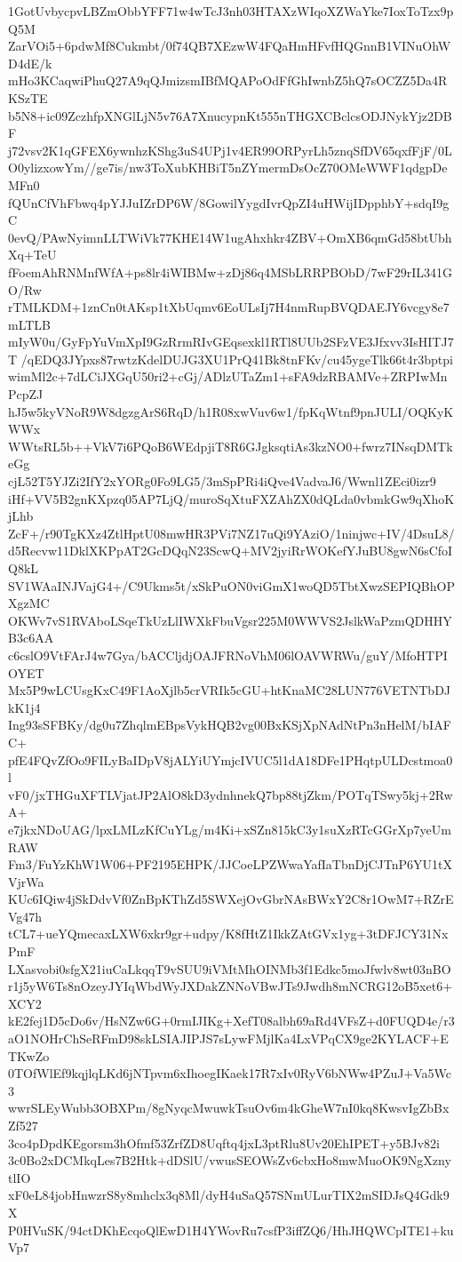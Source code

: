 1GotUvbycpvLBZmObbYFF71w4wTcJ3nh03HTAXzWIqoXZWaYke7IoxToTzx9pQ5M
ZarVOi5+6pdwMf8Cukmbt/0f74QB7XEzwW4FQaHmHFvfHQGnnB1VINuOhWD4dE/k
mHo3KCaqwiPhuQ27A9qQJmizsmIBfMQAPoOdFfGhIwnbZ5hQ7sOCZZ5Da4RKSzTE
b5N8+ic09ZczhfpXNGlLjN5v76A7XnucypnKt555nTHGXCBclcsODJNykYjz2DBF
j72vsv2K1qGFEX6ywnhzKShg3uS4UPj1v4ER99ORPyrLh5znqSfDV65qxfFjF/0L
O0ylizxowYm//ge7is/nw3ToXubKHBiT5nZYmermDsOcZ70OMeWWF1qdgpDeMFn0
fQUnCfVhFbwq4pYJJuIZrDP6W/8GowilYygdIvrQpZI4uHWijIDpphbY+sdqI9gC
0evQ/PAwNyimnLLTWiVk77KHE14W1ugAhxhkr4ZBV+OmXB6qmGd58btUbhXq+TeU
fFoemAhRNMnfWfA+ps8lr4iWIBMw+zDj86q4MSbLRRPBObD/7wF29rIL341GO/Rw
rTMLKDM+1znCn0tAKsp1tXbUqmv6EoULsIj7H4nmRupBVQDAEJY6vcgy8e7mLTLB
mIyW0u/GyFpYuVmXpI9GzRrmRIvGEqsexkl1RTl8UUb2SFzVE3Jfxvv3IsHITJ7T
/qEDQ3JYpxs87rwtzKdelDUJG3XU1PrQ41Bk8tnFKv/cu45ygeTlk66t4r3bptpi
wimMl2c+7dLCiJXGqU50ri2+cGj/ADlzUTaZm1+sFA9dzRBAMVe+ZRPIwMnPcpZJ
hJ5w5kyVNoR9W8dgzgArS6RqD/h1R08xwVuv6w1/fpKqWtnf9pnJULI/OQKyKWWx
WWtsRL5b++VkV7i6PQoB6WEdpjiT8R6GJgksqtiAs3kzNO0+fwrz7INsqDMTkeGg
cjL52T5YJZi2IfY2xYORg0Fo9LG5/3mSpPRi4iQve4VadvaJ6/Wwnl1ZEci0izr9
iHf+VV5B2gnKXpzq05AP7LjQ/muroSqXtuFXZAhZX0dQLda0vbmkGw9qXhoKjLhb
ZcF+/r90TgKXz4ZtlHptU08mwHR3PVi7NZ17uQi9YAziO/1ninjwc+IV/4DsuL8/
d5Recvw11DklXKPpAT2GcDQqN23ScwQ+MV2jyiRrWOKefYJuBU8gwN6sCfoIQ8kL
SV1WAaINJVajG4+/C9Ukms5t/xSkPuON0viGmX1woQD5TbtXwzSEPIQBhOPXgzMC
OKWv7vS1RVAboLSqeTkUzLlIWXkFbuVgsr225M0WWVS2JslkWaPzmQDHHYB3c6AA
c6cslO9VtFArJ4w7Gya/bACCljdjOAJFRNoVhM06lOAVWRWu/guY/MfoHTPIOYET
Mx5P9wLCUsgKxC49F1AoXjlb5crVRIk5cGU+htKnaMC28LUN776VETNTbDJkK1j4
Ing93sSFBKy/dg0u7ZhqlmEBpsVykHQB2vg00BxKSjXpNAdNtPn3nHelM/bIAFC+
pfE4FQvZfOo9FILyBaIDpV8jALYiUYmjcIVUC5l1dA18DFe1PHqtpULDcstmoa0l
vF0/jxTHGuXFTLVjatJP2AlO8kD3ydnhnekQ7bp88tjZkm/POTqTSwy5kj+2RwA+
e7jkxNDoUAG/lpxLMLzKfCuYLg/m4Ki+xSZn815kC3y1suXzRTcGGrXp7yeUmRAW
Fm3/FuYzKhW1W06+PF2195EHPK/JJCoeLPZWwaYafIaTbnDjCJTnP6YU1tXVjrWa
KUc6IQiw4jSkDdvVf0ZnBpKThZd5SWXejOvGbrNAsBWxY2C8r1OwM7+RZrEVg47h
tCL7+ueYQmecaxLXW6xkr9gr+udpy/K8fHtZ1IkkZAtGVx1yg+3tDFJCY31NxPmF
LXasvobi0sfgX21iuCaLkqqT9vSUU9iVMtMhOINMb3f1Edkc5moJfwlv8wt03nBO
r1j5yW6Ts8nOzeyJYIqWbdWyJXDakZNNoVBwJTs9Jwdh8mNCRG12oB5xet6+XCY2
kE2fej1D5cDo6v/HsNZw6G+0rmIJIKg+XefT08albh69aRd4VFsZ+d0FUQD4e/r3
aO1NOHrChSeRFmD98skLSIAJIPJS7sLywFMjlKa4LxVPqCX9ge2KYLACF+ETKwZo
0TOfWlEf9kqjlqLKd6jNTpvm6xIhoegIKaek17R7xIv0RyV6bNWw4PZuJ+Va5Wc3
wwrSLEyWubb3OBXPm/8gNyqcMwuwkTsuOv6m4kGheW7nI0kq8KwsvIgZbBxZf527
3co4pDpdKEgorsm3hOfmf53ZrfZD8Uqftq4jxL3ptRlu8Uv20EhIPET+y5BJv82i
3c0Bo2xDCMkqLes7B2Htk+dDSlU/vwusSEOWsZv6cbxHo8mwMuoOK9NgXznytlIO
xF0eL84jobHnwzrS8y8mhclx3q8Ml/dyH4uSaQ57SNmULurTIX2mSIDJsQ4Gdk9X
P0HVuSK/94ctDKhEcqoQlEwD1H4YWovRu7csfP3iffZQ6/HhJHQWCpITE1+kuVp7
